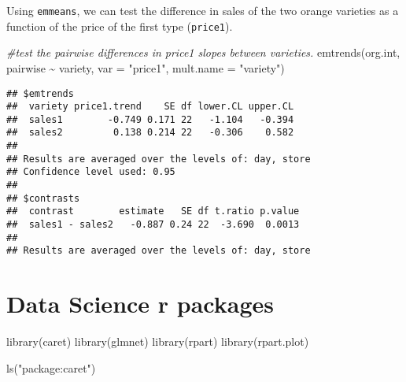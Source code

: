 \documentclass[
]{book}
\newenvironment{Shaded}{\begin{snugshade}}{\end{snugshade}}
\newcommand{\AttributeTok}[1]{\textcolor[rgb]{0.77,0.63,0.00}{#1}}
\newcommand{\CommentTok}[1]{\textcolor[rgb]{0.56,0.35,0.01}{\textit{#1}}}
\newcommand{\FunctionTok}[1]{\textcolor[rgb]{0.00,0.00,0.00}{#1}}
\newcommand{\NormalTok}[1]{#1}
\newcommand{\SpecialCharTok}[1]{\textcolor[rgb]{0.00,0.00,0.00}{#1}}
\newcommand{\StringTok}[1]{\textcolor[rgb]{0.31,0.60,0.02}{#1}}
\begin{document}
Using \texttt{emmeans}, we can test the difference in sales of the two orange varieties as a function of the price of the first type (\texttt{price1}).

\begin{Shaded}
\begin{Highlighting}[]
\CommentTok{\#test the pairwise differences in price1 slopes between varieties.}
\FunctionTok{emtrends}\NormalTok{(org.int, pairwise }\SpecialCharTok{\textasciitilde{}}\NormalTok{ variety, }\AttributeTok{var =} \StringTok{"price1"}\NormalTok{, }\AttributeTok{mult.name =} \StringTok{"variety"}\NormalTok{)}
\end{Highlighting}
\end{Shaded}

\begin{verbatim}
## $emtrends
##  variety price1.trend    SE df lower.CL upper.CL
##  sales1        -0.749 0.171 22   -1.104   -0.394
##  sales2         0.138 0.214 22   -0.306    0.582
## 
## Results are averaged over the levels of: day, store 
## Confidence level used: 0.95 
## 
## $contrasts
##  contrast        estimate   SE df t.ratio p.value
##  sales1 - sales2   -0.887 0.24 22  -3.690  0.0013
## 
## Results are averaged over the levels of: day, store
\end{verbatim}

\hypertarget{data-science-r-packages}{%
\chapter{Data Science r packages}\label{data-science-r-packages}}

\begin{Shaded}
\begin{Highlighting}[]
\FunctionTok{library}\NormalTok{(caret)}
\FunctionTok{library}\NormalTok{(glmnet)}
\FunctionTok{library}\NormalTok{(rpart)}
\FunctionTok{library}\NormalTok{(rpart.plot)}
\end{Highlighting}
\end{Shaded}

\begin{Shaded}
\begin{Highlighting}[]
\FunctionTok{ls}\NormalTok{(}\StringTok{"package:caret"}\NormalTok{)}
\end{Highlighting}
\end{Shaded}
\end{document}
